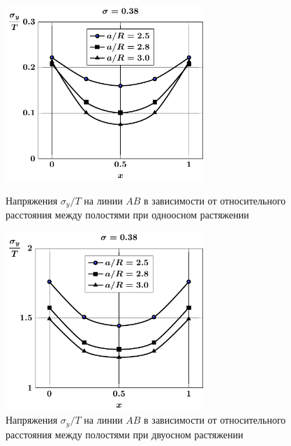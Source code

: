 \begin{figure}[h!]
\centering\footnotesize
\parbox[b]{7.5cm}{\centering\includegraphics[width=7.5cm]{spheres-cav13-a-t1-sig_y.pdf}
\caption{Напряжения $\sigma_y/T$ на линии $AB$ в зависимости от относительного расстояния между полостями при одноосном растяжении
\label{f:8:40}}}\hfil\hfil
\parbox[b]{7.5cm}{\centering\includegraphics[width=7.5cm]{spheres-cav13-a-t2-sig_y.pdf}
\caption{Напряжения $\sigma_y/T$ на линии $AB$ в зависимости от относительного расстояния между полостями при двуосном растяжении
\label{f:8:41}}}
\end{figure}

